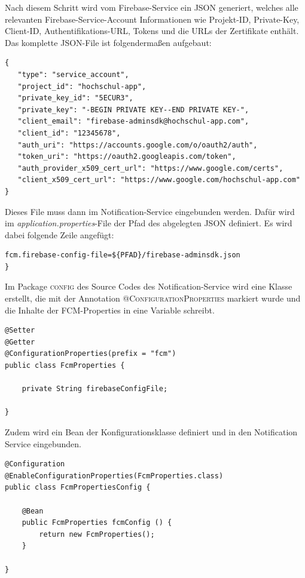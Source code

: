 Nach diesem Schritt wird vom Firebase-Service ein \ac{JSON} generiert, welches alle relevanten Firebase-Service-Account Informationen wie Projekt-ID, Private-Key, Client-ID, Authentifikations-\ac{URL}, Tokens und die \acp{URL}  der Zertifikate enthält. Das komplette \ac{JSON}-File ist folgendermaßen aufgebaut:

\newpage
\begin{lstlisting}[caption={Firebase Service Account JSON}]
{
   "type": "service_account",
   "project_id": "hochschul-app",
   "private_key_id": "5ECUR3",
   "private_key": "-BEGIN PRIVATE KEY--END PRIVATE KEY-",
   "client_email": "firebase-adminsdk@hochschul-app.com",
   "client_id": "12345678",
   "auth_uri": "https://accounts.google.com/o/oauth2/auth",
   "token_uri": "https://oauth2.googleapis.com/token",
   "auth_provider_x509_cert_url": "https://www.google.com/certs",
   "client_x509_cert_url": "https://www.google.com/hochschul-app.com"
}
\end{lstlisting}

Dieses File muss dann im Notification-Service eingebunden werden. Dafür wird im \textit{application.properties}-File der Pfad des abgelegten \ac{JSON} definiert. Es wird dabei folgende Zeile angefügt: 

\begin{lstlisting}[caption={Firebase Service Account application.properties Datei}]
fcm.firebase-config-file=${PFAD}/firebase-adminsdk.json
}\end{lstlisting}

Im Package \textsc{config} des Source Codes des Notification-Service wird eine Klasse erstellt, die mit der Annotation \textsc{@ConfigurationProperties} markiert wurde und die Inhalte der \ac{FCM}-Properties in eine Variable schreibt.

\begin{lstlisting}[caption={Firebase Service Account Variable}]
@Setter
@Getter
@ConfigurationProperties(prefix = "fcm")
public class FcmProperties {

    private String firebaseConfigFile;

}
\end{lstlisting}

Zudem wird ein Bean der Konfigurationsklasse definiert und in den Notification Service eingebunden.

\newpage
\begin{lstlisting}[caption={Firebase Service Account Bean}]
@Configuration
@EnableConfigurationProperties(FcmProperties.class)
public class FcmPropertiesConfig {

    @Bean
    public FcmProperties fcmConfig () {
        return new FcmProperties();
    }

}
\end{lstlisting}

